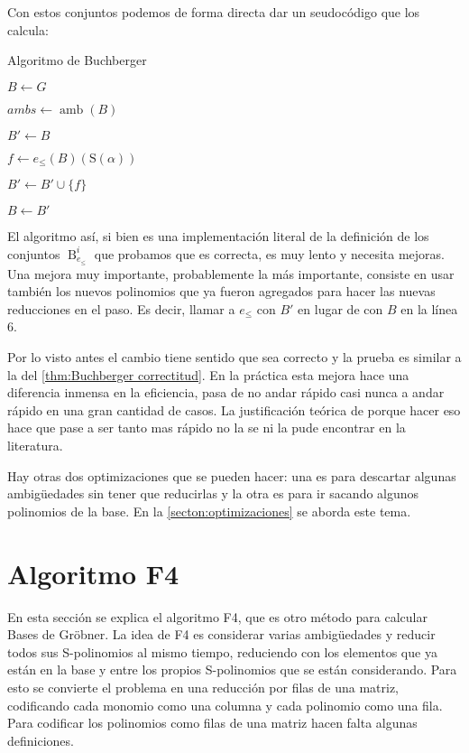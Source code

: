\documentclass[12pt]{report}
\theoremstyle{customstyle}
\theoremstyle{factstyle}
\DeclareMathOperator{\amb}{amb}
\renewcommand{\S}{\text{S}}
\DeclareMathOperator{\B}{B}
\begin{document}
Con estos conjuntos podemos de forma directa dar un seudocódigo que los calcula:

\begin{algorithm}[H] %
  \caption{Algoritmo de Buchberger}\label{alg:Buchberger}
  $B ← G$

  \Loop{} {
    $ambs ← \amb(B)$

    $B' ← B$

     {
      $f ← e_≤(B)(\S(α))$

       {
        $B' ← B' ∪ \{f\}$
      }
    }

     {
      \Break
    }

    $B ← B'$
  }
\end{algorithm}

El algoritmo así, si bien es una implementación literal de la definición de los conjuntos $\B_{e_≤}^i$ que probamos que es correcta, es muy lento y necesita mejoras. Una mejora muy importante, probablemente la más importante, consiste en usar también los nuevos polinomios que ya fueron agregados para hacer las nuevas reducciones en el paso. Es decir, llamar a $e_≤$ con $B'$ en lugar de con $B$ en la línea 6. %

Por lo visto antes el cambio tiene sentido que sea correcto y la prueba es similar a la del \cref{thm:Buchberger correctitud}. En la práctica esta mejora hace una diferencia inmensa en la eficiencia, pasa de no andar rápido casi nunca a andar rápido en una gran cantidad de casos. La justificación teórica de porque hacer eso hace que pase a ser tanto mas rápido no la se ni la pude encontrar en la literatura.

Hay otras dos optimizaciones que se pueden hacer: una es para descartar algunas ambigüedades sin tener que reducirlas y la otra es para ir sacando algunos polinomios de la base. En la \cref{secton:optimizaciones} se aborda este tema.

\section{Algoritmo F4}

En esta sección se explica el algoritmo F4, que es otro método para calcular Bases de Gröbner. La idea de F4 es considerar varias ambigüedades y reducir todos sus S-polinomios al mismo tiempo, reduciendo con los elementos que ya están en la base y entre los propios S-polinomios que se están considerando. Para esto se convierte el problema en una reducción por filas de una matriz, codificando cada monomio como una columna y cada polinomio como una fila. Para codificar los polinomios como filas de una matriz hacen falta algunas definiciones.
\end{document}
